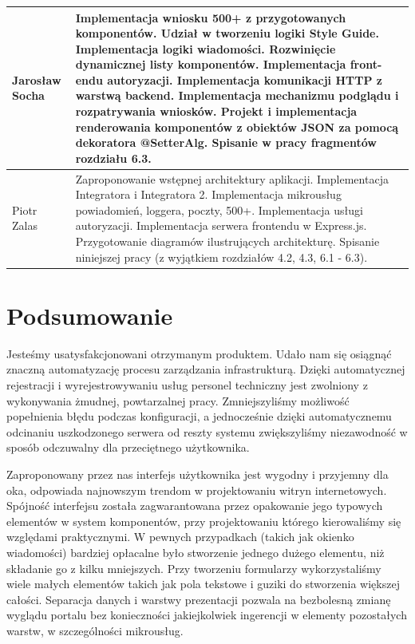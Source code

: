 \documentclass[licencjacka]{pracamgr}
\begin{document}
\begin{tabularx}{\linewidth}{|l|X|}
	\hline
	Jarosław Socha & Implementacja wniosku 500+ z przygotowanych komponentów. \newline
		Udział w tworzeniu logiki Style Guide. \newline
		Implementacja logiki wiadomości. \newline
		Rozwinięcie dynamicznej listy komponentów. \newline
 		Implementacja front-endu autoryzacji. \newline
 		Implementacja komunikacji HTTP z warstwą backend. \newline
		Implementacja mechanizmu podglądu i rozpatrywania wniosków. \newline
		Projekt i implementacja renderowania komponentów z obiektów JSON za pomocą dekoratora @SetterAlg. \newline
		Spisanie w pracy fragmentów rozdziału 6.3.
	\\
	\hline 
	Piotr Zalas & Zaproponowanie wstępnej architektury aplikacji.\newline
	  Implementacja Integratora i Integratora 2.\newline
	  Implementacja mikrousług powiadomień, loggera, poczty, 500+.\newline
	  Implementacja usługi autoryzacji.\newline
	  Implementacja serwera frontendu w Express.js.\newline
	  Przygotowanie diagramów ilustrujących architekturę.\newline
	  Spisanie niniejszej pracy (z wyjątkiem rozdziałów 4.2, 4.3, 6.1 - 6.3).\\
	\hline
\end{tabularx}

\chapter{Podsumowanie}

Jesteśmy usatysfakcjonowani otrzymanym produktem. Udało nam się osiągnąć znaczną
automatyzację procesu zarządzania infrastrukturą. Dzięki automatycznej rejestracji i
wyrejestrowywaniu usług personel techniczny jest zwolniony z wykonywania żmudnej,
powtarzalnej pracy. Zmniejszyliśmy możliwość popełnienia błędu podczas konfiguracji,
a jednocześnie dzięki automatycznemu odcinaniu uszkodzonego serwera od reszty systemu
zwiększyliśmy niezawodność w sposób odczuwalny dla przeciętnego użytkownika.

Zaproponowany przez nas interfejs użytkownika jest wygodny i przyjemny dla oka,
odpowiada najnowszym trendom w projektowaniu witryn internetowych. Spójność interfejsu
została zagwarantowana przez opakowanie jego typowych elementów w system komponentów,
przy projektowaniu którego kierowaliśmy się względami praktycznymi. W pewnych przypadkach
(takich jak okienko wiadomości) bardziej opłacalne było stworzenie jednego dużego
elementu, niż składanie go z kilku mniejszych. Przy tworzeniu formularzy wykorzystaliśmy
wiele małych elementów takich jak pola tekstowe i guziki do stworzenia większej
całości. Separacja danych i warstwy prezentacji pozwala na bezbolesną zmianę wyglądu
portalu bez konieczności jakiejkolwiek ingerencji w elementy pozostałych warstw, w
szczególności mikrousług.
\end{document}
